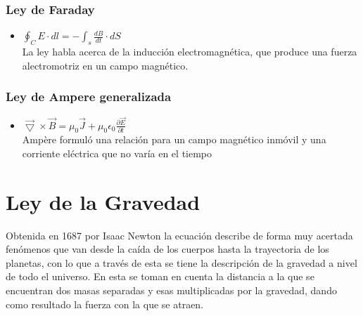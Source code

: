 \documentclass[letterpaper, 12pt]{article}
\begin{document}
    \subsubsection*{Ley de Faraday}
    
    \begin{itemize}
        \item[\textcolor{Simbolos}{\boxdot}] $\oint_{C}E \cdot dl = - \int_{s} \frac{dB}{dt} \cdot dS $\\
        
        La ley habla acerca de la inducción electromagnética, que produce una fuerza alectromotriz en un campo magnético.
        
    \end{itemize}
    
    \subsubsection*{Ley de Ampere generalizada}
    
    \begin{itemize}
        \item[\textcolor{Simbolos}{\boxdot}]
        
        $\vec{\bigtriangledown} \times \vec{B}=\mu_{0}\vec{J}+\mu_{0}\epsilon_{0}\frac{\partial \vec{E}}{\partial t}$\\
        
       Ampère formuló una relación para un campo magnético inmóvil y una corriente eléctrica que no varía en el tiempo
        
        
    \end{itemize}
    
    \newpage
    \pagestyle{fancy}
            \fancyhf{}
            \cfoot{\thepage}
                 
    \section*{Ley de la Gravedad}
    
    Obtenida en 1687 por Isaac Newton la ecuación describe de forma muy acertada fenómenos que van desde la caída de los cuerpos hasta la trayectoria de los planetas, con lo que a través de esta se tiene la descripción de la gravedad a nivel de todo el universo. En esta se toman en cuenta la distancia a la que se encuentran dos masas separadas y esas multiplicadas por la gravedad, dando como resultado la fuerza con la que se atraen.
    
\end{document}
